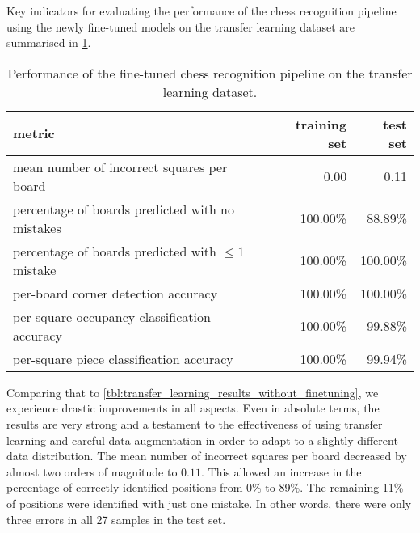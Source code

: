 \documentclass[../report.tex]{subfiles}
\begin{document}
Key indicators for evaluating the performance of the chess recognition pipeline using the newly fine-tuned models on the transfer learning dataset are summarised in \cref{tbl:transfer_learning_results}.
\begin{table}
    \centering
    \begin{tabular}{lrr}
        \toprule
        metric & training set & test set \\
        \midrule
        mean number of incorrect squares per board           & 0.00     & 0.11 \\
        percentage of boards predicted with no mistakes      & 100.00\% & 88.89\%   \\
        percentage of boards predicted with $\leq 1$ mistake & 100.00\% & 100.00\%   \\
        per-board corner detection accuracy                  & 100.00\% & 100.00\% \\
        per-square occupancy classification accuracy         & 100.00\% & 99.88\% \\
        per-square piece classification accuracy             & 100.00\% & 99.94\% \\
        \bottomrule
    \end{tabular}
    \caption{Performance of the fine-tuned chess recognition pipeline on the transfer learning dataset.}
    \label{tbl:transfer_learning_results}
\end{table}
Comparing that to \cref{tbl:transfer_learning_results_without_finetuning}, we experience drastic improvements in all aspects.
Even in absolute terms, the results are very strong and a testament to the effectiveness of using transfer learning and careful data augmentation in order to adapt to a slightly different data distribution.
The mean number of incorrect squares per board decreased by almost two orders of magnitude to $0.11$.
This allowed an increase in the percentage of correctly identified positions from 0\% to 89\%. 
The remaining 11\% of positions were identified with just one mistake.
In other words, there were only three errors in all 27 samples in the test set.
\end{document}

